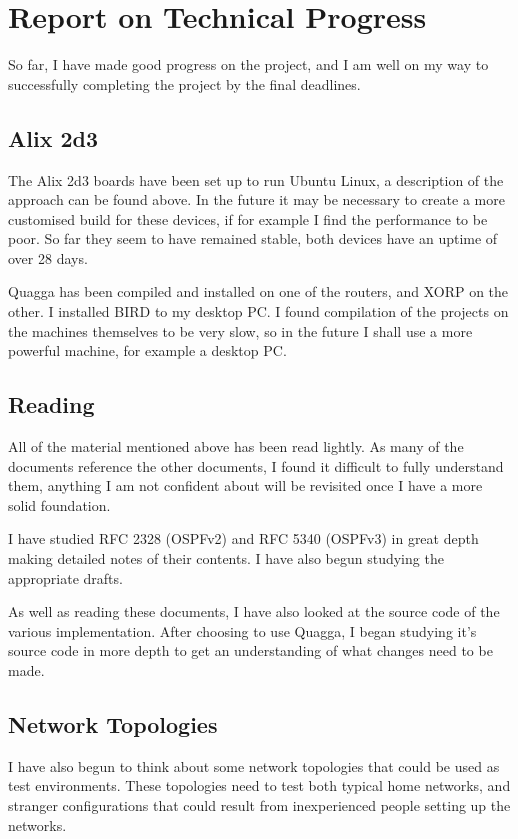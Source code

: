 \documentclass[12pt]{report}
\begin{document}
\chapter{Report on Technical Progress}
So far, I have made good progress on the project, and I am well on my way to
successfully completing the project by the final deadlines.


\section{Alix 2d3}
The Alix 2d3 boards have been set up to run Ubuntu Linux, a description of the
approach can be found above. In the future it may be necessary to create a more
customised build for these devices, if for example I find the performance to be
poor. So far they seem to have remained stable, both devices have an uptime of
over 28 days.

Quagga has been compiled and installed on one of the routers, and XORP on the
other. I installed BIRD to my desktop PC.  I found compilation of the projects on the machines themselves to be
very slow, so in the future I shall use a more powerful machine, for example a
desktop PC.

\section{Reading}
All of the material mentioned above has been read lightly. As many of the
documents reference the other documents, I found it difficult to fully
understand them, anything I am not confident about will be revisited once I have
a more solid foundation.

I have studied RFC 2328 (OSPFv2) and RFC 5340 (OSPFv3) in great depth making
detailed notes of their contents. I have also begun studying the appropriate
drafts.

As well as reading these documents, I have also looked at the source code of the
various implementation. After choosing to use Quagga, I began studying it's
source code in more depth to get an understanding of what changes need to be
made. 

\section{Network Topologies}
I have also begun to think about some network topologies that could be
used as test environments. These topologies need to test both typical home
networks, and stranger configurations that could result from inexperienced
people setting up the networks. 
 
\end{document}
